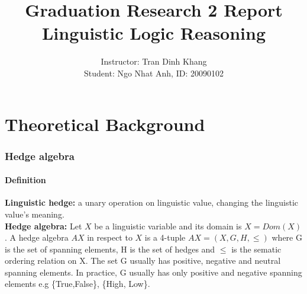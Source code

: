 \documentclass[26pt,fleqn,]{article}
\date{}
\title{Graduation Research 2 Report\\
Linguistic Logic Reasoning}
\author{Instructor: Tran Dinh Khang\\Student: Ngo Nhat Anh, ID: 20090102\\}
\begin{document}
\maketitle
%
%

\part{Theoretical Background}
\label{part1}

\section{Hedge algebra}
\subsection{Definition}
{\bfseries Linguistic hedge:} a unary operation on linguistic value, changing the linguistic value's meaning.
\\
{\bfseries Hedge algebra:} Let \(X\) be a linguistic variable and its domain is \(X = Dom(X)\). A hedge 
algebra \(AX\) in respect to \(X\) is a 4-tuple \(AX = (X,G,H,\le)\) where G is the set of spanning
elements, H is the set of hedges and \(\le\) is the sematic ordering relation on X.
The set G usually has positive, negative and neutral spanning elements. In practice, G usually has only
positive and negative spanning elements e.g \{True,False\}, \{High, Low\}.\\
\end{document}
